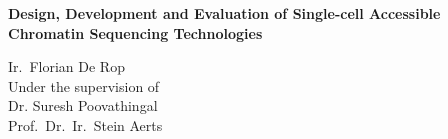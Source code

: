 \begin{titlepage}
	\begin{center}
		\vspace*{1cm}

		\Huge
		\textbf{Design, Development and Evaluation of Single-cell Accessible Chromatin Sequencing Technologies}

		\vspace{1.2cm}
		\begin{figure}[ht]
			\centering
			
		\end{figure}
		\vfill
		\vspace{0.8cm}

		\large
		Ir.\ Florian De Rop\\

		\vspace{0.8cm}
		\large
		Under the supervision of\\
		\vspace{0.4cm}
		Dr. Suresh Poovathingal\\
		Prof.\ Dr.\ Ir.\ Stein Aerts\\

	\end{center}
\end{titlepage}